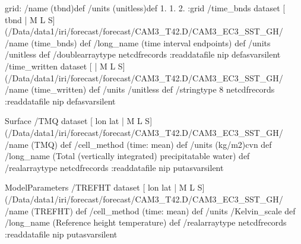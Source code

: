 grid:
/name (tbnd)def
/units (unitless)def
 1. 1. 2.
:grid
 /time_bnds{
dataset
[ tbnd | M L S] (/Data/data1/iri/forecast/forecast/CAM3_T42.D/CAM3_EC3_SST_GH/%
/name (time_bnds) def
 /long_name (time interval endpoints) def
 /units /unitless def
 /doublearraytype netcdfrecords :readdatafile
nip
}defasvarsilent
 /time_written{
dataset
[ | M L S] (/Data/data1/iri/forecast/forecast/CAM3_T42.D/CAM3_EC3_SST_GH/%
/name (time_written) def
 /units /unitless def
 /stringtype 8 netcdfrecords :readdatafile
nip
}defasvarsilent

\begin{ingrid}

Surface /TMQ{
dataset
[ lon lat | M L S] (/Data/data1/iri/forecast/forecast/CAM3_T42.D/CAM3_EC3_SST_GH/%
/name (TMQ) def
 /cell_method (time: mean) def
 /units (kg/m2)cvn def
 /long_name (Total (vertically integrated) precipitatable water) def
 /realarraytype netcdfrecords :readdatafile
nip
}putasvarsilent



ModelParameters /TREFHT{
dataset
[ lon lat | M L S] (/Data/data1/iri/forecast/forecast/CAM3_T42.D/CAM3_EC3_SST_GH/%
/name (TREFHT) def
 /cell_method (time: mean) def
 /units /Kelvin_scale def
 /long_name (Reference height temperature) def
 /realarraytype netcdfrecords :readdatafile
nip
}putasvarsilent


\end{ingrid}
